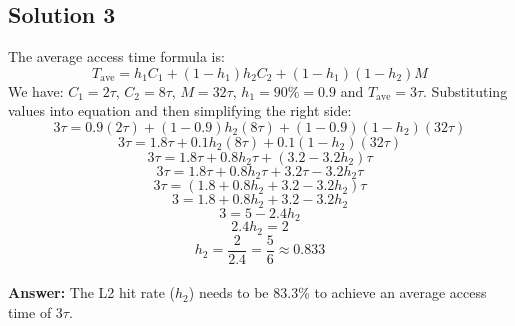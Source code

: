 \documentclass{article}
\begin{document}
\subsection*{Solution 3} The average access time formula is:
\[T_{\text{ave}} = h_1C_1 + (1-h_1)h_2C_2 + (1-h_1)(1-h_2)M\]
We have: $C_1 = 2\tau$, $C_2 = 8\tau$, $M = 32\tau$, $h_1 = 90\% = 0.9$ and $T_{\text{ave}} = 3\tau$. Substituting values into equation and then simplifying the right side:\\
\[3\tau = 0.9(2\tau) + (1-0.9)h_2(8\tau) + (1-0.9)(1-h_2)(32\tau)\]
\[3\tau = 1.8\tau + 0.1h_2(8\tau) + 0.1(1-h_2)(32\tau)\]
\[3\tau = 1.8\tau + 0.8h_2\tau + (3.2 - 3.2h_2)\tau\]
\[3\tau = 1.8\tau + 0.8h_2\tau + 3.2\tau - 3.2h_2\tau\]
\[3\tau = (1.8 + 0.8h_2 + 3.2 - 3.2h_2)\tau\]
\[3 = 1.8 + 0.8h_2 + 3.2 - 3.2h_2\]
\[3 = 5 - 2.4h_2\]
\[2.4h_2 = 2\]
\[h_2 = \frac{2}{2.4} = \frac{5}{6} \approx 0.833\]
\\\textbf{Answer:} The L2 hit rate ($h_2$) needs to be 83.3\% to achieve an average access time of $3\tau$.
\end{document}
